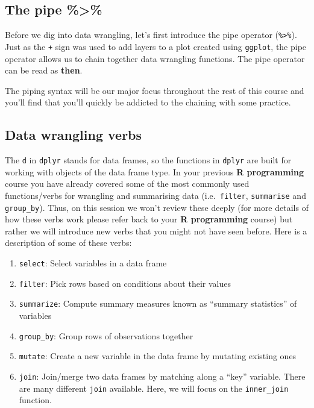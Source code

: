 \documentclass[
  letterpaper,
  DIV=11,
  numbers=noendperiod]{scrartcl}
\begin{document}
\subsection{The pipe \%\textgreater\%}\label{piping}

Before we dig into data wrangling, let's first introduce the pipe
operator (\texttt{\%\textgreater{}\%}). Just as the \texttt{+} sign was
used to add layers to a plot created using \texttt{ggplot}, the pipe
operator allows us to chain together data wrangling functions. The pipe
operator can be read as \textbf{then}.

The piping syntax will be our major focus throughout the rest of this
course and you'll find that you'll quickly be addicted to the chaining
with some practice.

\subsection{Data wrangling verbs}\label{verbs}

The \texttt{d} in \texttt{dplyr} stands for data frames, so the
functions in \texttt{dplyr} are built for working with objects of the
data frame type. In your previous \textbf{R programming} course you have
already covered some of the most commonly used functions/verbs for
wrangling and summarising data (i.e.~\texttt{filter}, \texttt{summarise}
and \texttt{group\_by}). Thus, on this session we won't review these
deeply (for more details of how these verbs work please refer back to
your \textbf{R programming} course) but rather we will introduce new
verbs that you might not have seen before. Here is a description of some
of these verbs:

\begin{enumerate}
\def\labelenumi{\arabic{enumi}.}
\item
  \texttt{select}: Select variables in a data frame
\item
  \texttt{filter}: Pick rows based on conditions about their values
\item
  \texttt{summarize}: Compute summary measures known as ``summary
  statistics'' of variables
\item
  \texttt{group\_by}: Group rows of observations together
\item
  \texttt{mutate}: Create a new variable in the data frame by mutating
  existing ones
\item
  \texttt{join}: Join/merge two data frames by matching along a ``key''
  variable. There are many different \texttt{join} available. Here, we
  will focus on the \texttt{inner\_join} function.
\end{enumerate}
\end{document}
